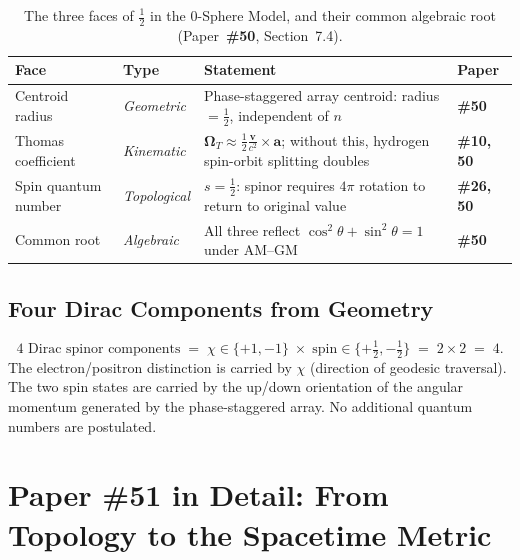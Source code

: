 \documentclass[12pt,letterpaper]{article}
\newcommand{\paperno}[1]{\textbf{\#{}#1}}
\newcommand{\OmT}{\boldsymbol{\Omega}_T}
\begin{document}
\begin{table}[h!]
\centering
\renewcommand{\arraystretch}{1.4}
\begin{tabular}{p{1.5cm}p{3.5cm}p{5.5cm}p{1.5cm}}
\toprule
\textbf{Face} & \textbf{Type} & \textbf{Statement} & \textbf{Paper} \\
\midrule
Centroid radius &
  \textit{Geometric} &
  Phase-staggered array centroid: radius $= \frac{1}{2}$, independent of $n$ &
  \paperno{50} \\
\addlinespace[0.2cm]
Thomas coefficient &
  \textit{Kinematic} &
  $\OmT \approx \frac{1}{2}\frac{\mathbf{v}}{c^2}\times\mathbf{a}$;
  without this, hydrogen spin-orbit splitting doubles &
  \paperno{10, 50} \\
\addlinespace[0.2cm]
Spin quantum number &
  \textit{Topological} &
  $s = \frac{1}{2}$: spinor requires $4\pi$ rotation to return to original value &
  \paperno{26, 50} \\
\midrule
Common root & \textit{Algebraic} &
  All three reflect $\cos^2\theta + \sin^2\theta = 1$ under AM--GM &
  \paperno{50} \\
\bottomrule
\end{tabular}
\caption{The three faces of $\frac{1}{2}$ in the 0-Sphere Model,
and their common algebraic root (Paper~\paperno{50}, Section~7.4).}
\label{tab:threehalf}
\end{table}

\subsection{Four Dirac Components from Geometry}

\begin{equation}
\text{4 Dirac spinor components}
\;=\; \chi\in\{+1,-1\} \;\times\; \mathrm{spin}\in\{+\tfrac{1}{2},-\tfrac{1}{2}\}
\;=\; 2\times 2 \;=\; 4.
\end{equation}
The electron/positron distinction is carried by $\chi$ (direction of geodesic traversal).
The two spin states are carried by the up/down orientation of the angular momentum
generated by the phase-staggered array.
No additional quantum numbers are postulated.

\clearpage

\section{\texorpdfstring{Paper \#51 in Detail: From Topology to the Spacetime Metric}{Paper \#51 in Detail: From Topology to the Spacetime Metric}}
\label{sec:p51}
\end{document}
